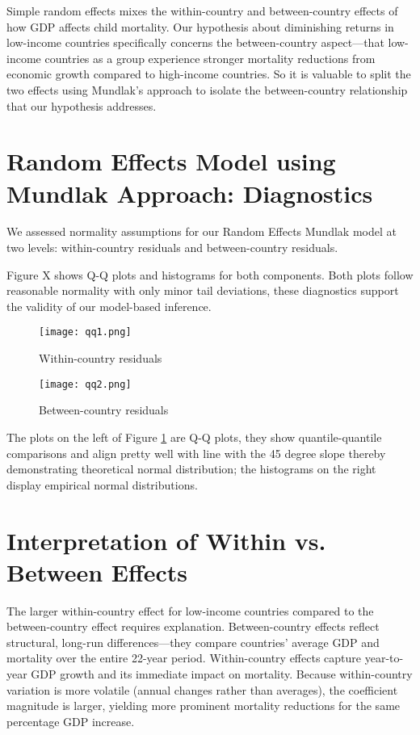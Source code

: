 \documentclass[10pt,a4paper]{article}
\begin{document}
    Simple random effects mixes the within-country and between-country effects of how GDP affects child mortality. Our hypothesis about diminishing returns in low-income countries specifically concerns the between-country aspect—that low-income countries as a group experience stronger mortality reductions from economic growth compared to high-income countries. So it is valuable to split the two effects using Mundlak's approach to isolate the between-country relationship that our hypothesis addresses.

\section{Random Effects Model using Mundlak Approach: Diagnostics}
We assessed normality assumptions for our Random Effects Mundlak model at two levels: within-country residuals and between-country residuals.

Figure X shows Q-Q plots and histograms for both components. Both plots follow reasonable normality with only minor tail deviations, these diagnostics support the validity of our model-based inference.

    \begin{figure}[H]
    \centering
    \begin{minipage}{0.7\textwidth}
        \centering
        \texttt{[image: qq1.png]}
    \end{minipage}
    \caption{Within-country residuals}
    \begin{minipage}{0.7\textwidth}
        \centering
        \texttt{[image: qq2.png]}
    \end{minipage}
    \caption{Between-country residuals}
    \label{fig:residuals}
    \end{figure} 

The plots on the left of Figure \ref{fig:residuals} are  Q-Q plots, they show quantile-quantile comparisons and align pretty well with line with the 45 degree slope thereby demonstrating theoretical normal distribution; the histograms on the right display empirical normal distributions.

\section{Interpretation of Within vs. Between Effects}

The larger within-country effect for low-income countries compared to the between-country effect requires explanation. Between-country effects reflect structural, long-run differences—they compare countries' average GDP and mortality over the entire 22-year period. Within-country effects capture year-to-year GDP growth and its immediate impact on mortality. Because within-country variation is more volatile (annual changes rather than averages), the coefficient magnitude is larger, yielding more prominent mortality reductions for the same percentage GDP increase.
\end{document}

